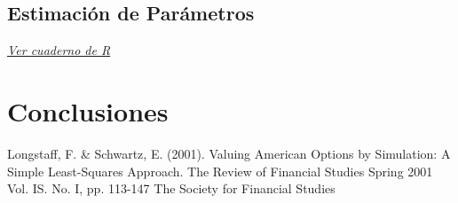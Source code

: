 \documentclass[12pt,reqno,letter]{article}
\begin{document}
	\subsection{Estimación de Parámetros}
	
	\textit{\href{https://www.dropbox.com/s/njszo4jprkzxhz6/estimacion_parametros_edp.pdf?dl=0}{Ver cuaderno de R}}
	
	\section{Conclusiones}\label{conclusiones}
	

	\begin{thebibliography}{9}
			 Longstaff, F. \& Schwartz, E. (2001). Valuing American Options by Simulation: A Simple Least-Squares Approach. The Review of Financial Studies Spring 2001 Vol. IS. No. I, pp. 113-147 The Society for Financial Studies
	\end{thebibliography}
	
	
	
\end{document}
